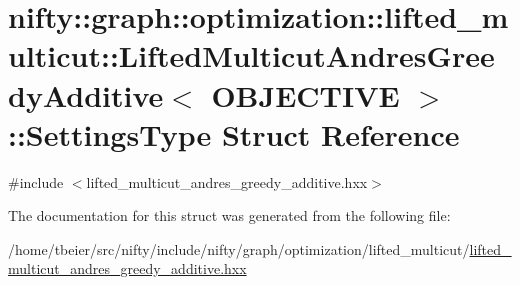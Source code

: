 \hypertarget{structnifty_1_1graph_1_1optimization_1_1lifted__multicut_1_1LiftedMulticutAndresGreedyAdditive_1_1SettingsType}{}\section{nifty\+:\+:graph\+:\+:optimization\+:\+:lifted\+\_\+multicut\+:\+:Lifted\+Multicut\+Andres\+Greedy\+Additive$<$ O\+B\+J\+E\+C\+T\+I\+V\+E $>$\+:\+:Settings\+Type Struct Reference}
\label{structnifty_1_1graph_1_1optimization_1_1lifted__multicut_1_1LiftedMulticutAndresGreedyAdditive_1_1SettingsType}


{\ttfamily \#include $<$lifted\+\_\+multicut\+\_\+andres\+\_\+greedy\+\_\+additive.\+hxx$>$}



The documentation for this struct was generated from the following file\+:\begin{DoxyCompactItemize}
\item 
/home/tbeier/src/nifty/include/nifty/graph/optimization/lifted\+\_\+multicut/\hyperlink{lifted__multicut__andres__greedy__additive_8hxx}{lifted\+\_\+multicut\+\_\+andres\+\_\+greedy\+\_\+additive.\+hxx}\end{DoxyCompactItemize}
